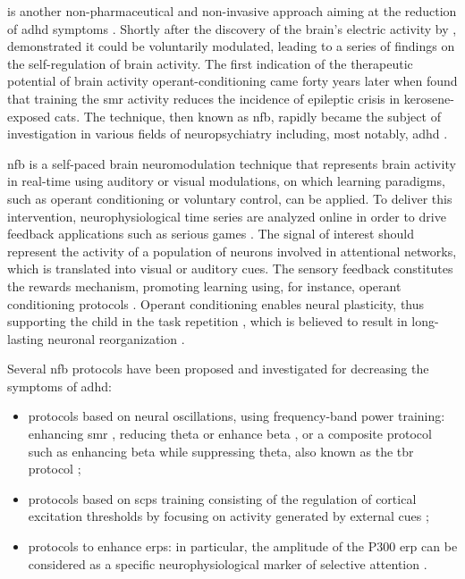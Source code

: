  is another non-pharmaceutical and non-invasive approach aiming at the reduction of \gls{adhd} symptoms 
\citep{Arns2015, Steffert2010, Marzbani2016}. Shortly after the discovery of the brain's electric activity by 
\citet{Berger1929}, \citet{Durup1935} demonstrated it could be voluntarily modulated, leading to a series of findings on the 
self-regulation of brain activity. The first indication of the therapeutic potential of brain activity operant-conditioning 
came forty years later when \citet{Sterman1974} found that training the \gls{smr} activity reduces the incidence 
of epileptic crisis in kerosene-exposed cats. The technique, then known as \gls{nfb}, rapidly became the subject of investigation in various 
fields of neuropsychiatry including, most notably, \gls{adhd} \citep{Lubar1976, Rossiter1995, Linden1996, Maurizio2014}.

\Gls{nfb} is a self-paced brain neuromodulation technique that represents brain activity in real-time using auditory 
or visual modulations, on which learning paradigms, such as operant conditioning
\citep{Reynolds1975} or voluntary control, can be applied. To deliver this intervention, neurophysiological time series 
are analyzed online in order to drive feedback applications such as serious games \citep{Wang2010}. 
The signal of interest should represent the activity of a population of neurons involved in attentional networks, which is translated into 
visual or auditory cues. The sensory feedback constitutes the rewards mechanism, promoting learning using, for instance, operant conditioning 
protocols \citep{Sherlin2011}. Operant conditioning enables neural plasticity, thus supporting the child in the task repetition \citep{Skinner1961}, 
which is believed to result in long-lasting neuronal reorganization \citep{VanDoren2017}. 

Several \gls{nfb} protocols have been proposed and investigated for decreasing the symptoms of \gls{adhd}:
\begin{itemize} 
  \item protocols based on neural oscillations, using frequency-band power training: enhancing \gls{smr} \citep{Beauregard2006}, reducing theta  
	  \citep{Marzbani2016} or enhance beta \citep{Kropotov2005}, or a composite protocol such as enhancing beta while suppressing theta, also known as the \gls{tbr}
    protocol \citep{Lubar1976, Arns2013}; 
  \item protocols based on \glspl{scp} training consisting of the regulation of
    cortical excitation thresholds by focusing on activity generated by external cues 
    \citep{Heinrich2004, Banaschewski2007}; 
  \item protocols to enhance \glspl{erp}: in particular, the amplitude of the P300 \gls{erp} can be considered as a specific
    neurophysiological marker of selective attention \citep{Fouillen2017}.  
\end{itemize} 

